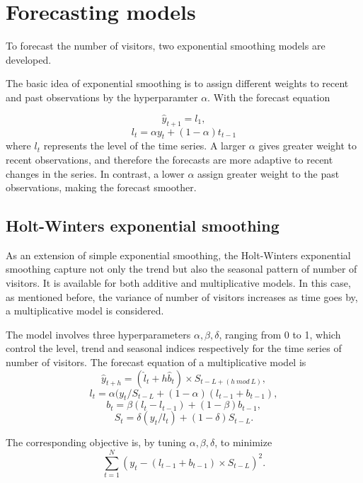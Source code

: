 \documentclass[letterpaper,12pt,twoside,]{pinp}
\begin{document}
\hypertarget{forecasting-models}{%
\section{Forecasting models}\label{forecasting-models}}

To forecast the number of visitors, two exponential smoothing models are
developed.

The basic idea of exponential smoothing is to assign different weights
to recent and past observations by the hyperparamter \(\alpha\). With
the forecast equation

\[\hat y_{t+1}=l_1,\] \[l_t=\alpha y_t+(1-\alpha)t_{t-1}\] where \(l_t\)
represents the level of the time series. A larger \(\alpha\) gives
greater weight to recent observations, and therefore the forecasts are
more adaptive to recent changes in the series. In contrast, a lower
\(\alpha\) assign greater weight to the past observations, making the
forecast smoother.

\hypertarget{holt-winters-exponential-smoothing}{%
\subsection{Holt-Winters exponential
smoothing}\label{holt-winters-exponential-smoothing}}

As an extension of simple exponential smoothing, the Holt-Winters
exponential smoothing capture not only the trend but also the seasonal
pattern of number of visitors. It is available for both additive and
multiplicative models. In this case, as mentioned before, the variance
of number of visitors increases as time goes by, a multiplicative model
is considered.

The model involves three hyperparameters \(\alpha,\beta,\delta\),
ranging from 0 to 1, which control the level, trend and seasonal indices
respectively for the time series of number of visitors. The forecast
equation of a multiplicative model is \[
\hat y_{t+h}=(\hat l_t+h\hat b_t) \times S_{t-L+(h~mod~L)},
\] \[
l_t=\alpha(y_t/S_{t-L}+(1-\alpha)(l_{t-1}+b_{t-1}),
\] \[
b_t=\beta(l_t-l_{t-1})+(1-\beta)b_{t-1},
\] \[
S_t=\delta(y_t/l_t)+(1-\delta)S_{t-L}.
\]

The corresponding objective is, by tuning \(\alpha,\beta,\delta\), to
minimize \[\sum^N_{t=1}(y_t-(l_{t-1}+b_{t-1})\times S_{t-L})^2.\]
\end{document}

